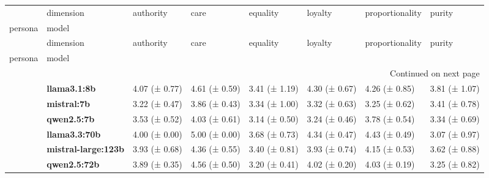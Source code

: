 \begin{longtable}{llllllll}
\toprule
 & dimension & authority & care & equality & loyalty & proportionality & purity \\
persona & model &  &  &  &  &  &  \\
\midrule
\endfirsthead
\toprule
 & dimension & authority & care & equality & loyalty & proportionality & purity \\
persona & model &  &  &  &  &  &  \\
\midrule
\endhead
\midrule
\multicolumn{8}{r}{Continued on next page} \\
\midrule
\endfoot
\bottomrule
\endlastfoot
\multirow[t]{6}{*}{\textbf{base}} & \textbf{llama3.1:8b} & 4.07 (± 0.77) & 4.61 (± 0.59) & 3.41 (± 1.19) & 4.30 (± 0.67) & 4.26 (± 0.85) & 3.81 (± 1.07) \\
\textbf{} & \textbf{mistral:7b} & 3.22 (± 0.47) & 3.86 (± 0.43) & 3.34 (± 1.00) & 3.32 (± 0.63) & 3.25 (± 0.62) & 3.41 (± 0.78) \\
\textbf{} & \textbf{qwen2.5:7b} & 3.53 (± 0.52) & 4.03 (± 0.61) & 3.14 (± 0.50) & 3.24 (± 0.46) & 3.78 (± 0.54) & 3.34 (± 0.69) \\
\textbf{} & \textbf{llama3.3:70b} & 4.00 (± 0.00) & 5.00 (± 0.00) & 3.68 (± 0.73) & 4.34 (± 0.47) & 4.43 (± 0.49) & 3.07 (± 0.97) \\
\textbf{} & \textbf{mistral-large:123b} & 3.93 (± 0.68) & 4.36 (± 0.55) & 3.40 (± 0.81) & 3.93 (± 0.74) & 4.15 (± 0.53) & 3.62 (± 0.88) \\
\textbf{} & \textbf{qwen2.5:72b} & 3.89 (± 0.35) & 4.56 (± 0.50) & 3.20 (± 0.41) & 4.02 (± 0.20) & 4.03 (± 0.19) & 3.25 (± 0.82) \\
\cline{1-8}
\end{longtable}
